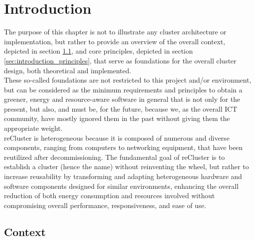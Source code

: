 \chapter{Introduction}
\label{cha:introduction}

The purpose of this chapter is not to illustrate any cluster architecture or implementation,
but rather to provide an overview of the overall context, depicted in section \ref{sec:introduction_context},
and core principles, depicted in section \ref{sec:introduction_principles}, that
serve as foundations for the overall cluster design, both theoretical and implemented.
\\ %
These so-called foundations are not restricted to this project and/or environment,
but can be considered as the minimum requirements and principles to obtain a
greener, energy and resource-aware software in general that is not only for the present,
but also, and must be, for the future, because we, as the overall ICT community,
have mostly ignored them in the past without giving them the appropriate weight.
\\ %

reCluster is heterogeneous because it is composed of numerous and diverse
components, ranging from computers to networking equipment, that have been
reutilized after decommissioning. The fundamental goal of reCluster is to establish
a cluster (hence the name) without reinventing the wheel, but rather to increase
reusability by transforming and adapting heterogeneous hardware and software
components designed for similar environments, enhancing the overall reduction of
both energy consumption and resources involved without compromising overall performance,
responsiveness, and ease of use.

\section{Context}
\label{sec:introduction_context}

